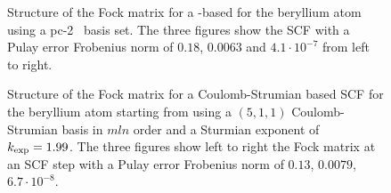 \begin{landscape}
\begin{figure}[p]
	\centering
	\caption[Structure of the Fock matrix for a \cGTO-based \SCF]
		{Structure of the Fock matrix for a \cGTO-based \SCF
		for the beryllium atom
		using a pc-2~\cite{Jensen2007} basis set.
		The three figures show the SCF with a Pulay error
		Frobenius norm of $0.18$, $0.0063$ and $4.1 \cdot 10^{-7}$
		from left to right.}
	\label{fig:StructureGaussianFock}
\end{figure}

\begin{figure}[p]
	\centering
	\caption{Structure of the Fock matrix for a Coulomb-Strumian based SCF
		for the beryllium atom starting from using a $(5,1,1)$
		Coulomb-Strumian basis in $mln$ order
		and a Sturmian exponent of $k_\text{exp} = 1.99$.
		The three figures show left to right the Fock matrix
		at an SCF step with a Pulay error Frobenius norm of
		$0.13$, $0.0079$, $6.7 \cdot 10^{-8}$.}
	\label{fig:StructureSturmianFock}
\end{figure}
\end{landscape}
